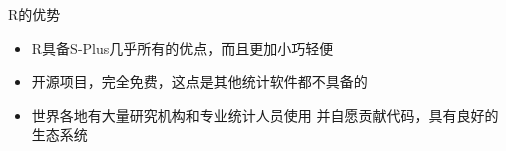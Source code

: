 \documentclass{beamerthemeMono}
\begin{document}
\begin{frame}[t]{\subsecname}{R的优势}
\begin{itemize}
 \item R具备S-Plus几乎所有的优点，而且更加小巧轻便
 \item 开源项目，完全免费，这点是其他统计软件都不具备的
 \item 世界各地有大量研究机构和专业统计人员使用
                 并自愿贡献代码，具有良好的生态系统
\end{itemize}  

\begin{overlayarea}{\textwidth}{\textheight}


\end{overlayarea}

\end{frame} 
\end{document}
